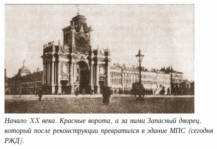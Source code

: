 \vfill

\begin{figure}[h!]
    \begin{minipage}{100mm}
    \includegraphics[width=100mm]{inc/57/1}
    \textit{\footnotesize{Начало XX века. Красные ворота, а за ними Запасный дворец, который после реконструкции превратился в здание МПС (сегодня РЖД).}}
    \end{minipage}
\end{figure}

\newpage


